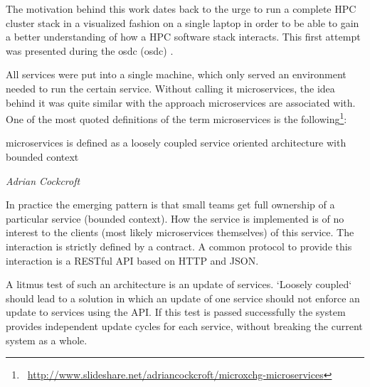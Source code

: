 The motivation behind this work dates back to the urge to run a complete HPC cluster stack in a visualized fashion on a single laptop in order to be able to gain a better understanding of how a HPC software stack interacts.
This first attempt was presented during the \gls{osdc} (\glsdesc{osdc}) .

All services were put into a single machine, which only served an environment needed to run the certain service.
Without calling it microservices, the idea behind it was quite similar with the approach microservices are associated with.
One of the most quoted definitions of the term microservices is the following\footnote{\Mundus~\url{http://www.slideshare.net/adriancockcroft/microxchg-microservices}}:
\epigraph{microservices is defined as a loosely coupled service oriented architecture with bounded context}{\textit{Adrian Cockcroft}}
In practice the emerging pattern is that small teams get full ownership of a particular service (bounded context).
How the service is implemented is of no interest to the clients (most likely microservices themselves) of this service.
The interaction is strictly defined by a contract. A common protocol to provide this interaction is a RESTful API based on HTTP and JSON.

A litmus test of such an architecture is an update of services. `Loosely coupled` should lead to a solution in which an update of one service
should not enforce an update to services using the API. If this test is passed successfully the system provides
independent update cycles for each service, without breaking the current system as a whole.

